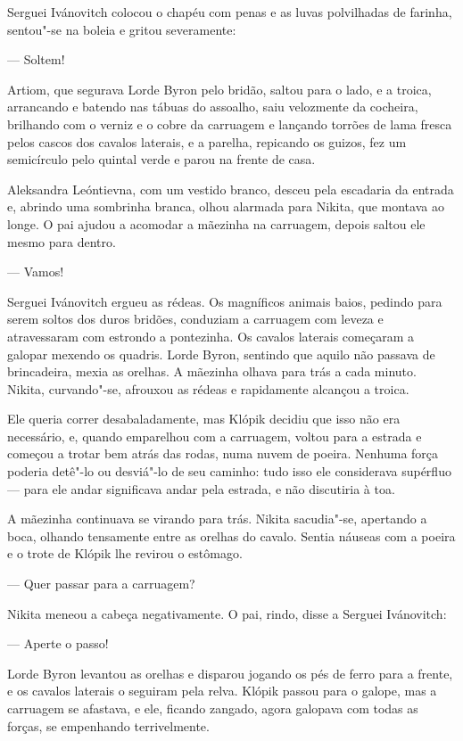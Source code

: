 Serguei Ivánovitch colocou o chapéu com penas e as luvas polvilhadas de
farinha, sentou"-se na boleia e gritou severamente:

--- Soltem!

Artiom, que segurava Lorde Byron pelo bridão, saltou para o lado, e a
troica, arrancando e batendo nas tábuas do assoalho, saiu velozmente da
cocheira, brilhando com o verniz e o cobre da carruagem e lançando
torrões de lama fresca pelos cascos dos cavalos laterais, e a parelha,
repicando os guizos, fez um semicírculo pelo quintal verde e parou na
frente de casa.

Aleksandra Leóntievna, com um vestido branco, desceu pela escadaria da
entrada e, abrindo uma sombrinha branca, olhou alarmada para Nikita, que
montava ao longe. O pai ajudou a acomodar a mãezinha na carruagem,
depois saltou ele mesmo para dentro.

--- Vamos!

Serguei Ivánovitch ergueu as rédeas. Os magníficos animais baios,
pedindo para serem soltos dos duros bridões, conduziam a carruagem com
leveza e atravessaram com estrondo a pontezinha. Os cavalos laterais
começaram a galopar mexendo os quadris. Lorde Byron, sentindo que aquilo
não passava de brincadeira, mexia as orelhas. A mãezinha olhava para
trás a cada minuto. Nikita, curvando"-se, afrouxou as rédeas e
rapidamente alcançou a troica.

Ele queria correr desabaladamente, mas Klópik decidiu que isso não era
necessário, e, quando emparelhou com a carruagem, voltou para a estrada
e começou a trotar bem atrás das rodas, numa nuvem de poeira. Nenhuma
força poderia detê"-lo ou desviá"-lo de seu caminho: tudo isso ele
considerava supérfluo --- para ele andar significava andar pela
estrada, e não discutiria à toa.

A mãezinha continuava se virando para trás. Nikita sacudia"-se, apertando
a boca, olhando tensamente entre as orelhas do cavalo. Sentia náuseas
com a poeira e o trote de Klópik lhe revirou o estômago.

--- Quer passar para a carruagem?

Nikita meneou a cabeça negativamente. O pai, rindo, disse a Serguei
Ivánovitch:

--- Aperte o passo!

Lorde Byron levantou as orelhas e disparou jogando os pés de ferro para
a frente, e os cavalos laterais o seguiram pela relva. Klópik passou
para o galope, mas a carruagem se afastava, e ele, ficando zangado,
agora galopava com todas as forças, se empenhando terrivelmente.


